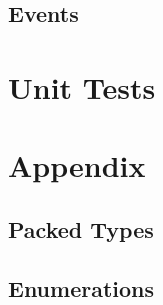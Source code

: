 

\subsection{Events}



\section{Unit Tests}



\section{Appendix}
\subsection{Packed Types}



\subsection{Enumerations}




